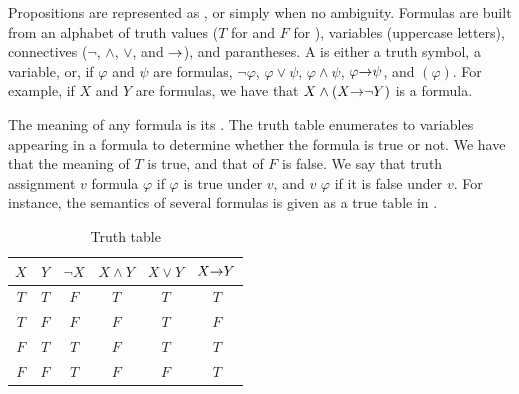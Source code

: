 Propositions are represented as , or simply  when no ambiguity.
Formulas are built from an alphabet of truth values ($T$ for  and $F$ for ),
variables (uppercase letters), connectives ($\neg$, $\land$, $\lor$, and $\mathit{\rightarrow}$), and parantheses.
A  is either a truth symbol, a variable, or, if $\varphi$ and $\psi$ are formulas,
$\neg \varphi$, $\varphi \lor \psi$, $\varphi \land \psi$, $ \varphi \mathit{\rightarrow} \psi$, and $(\varphi)$.
For example, if $X$ and $Y$ are formulas, we have that $X \land (X \mathit{\rightarrow} \neg Y)$ is a formula.

The meaning of any formula is its .
The truth table enumerates  to variables appearing in a formula to determine
whether the formula is true or not.
We have that the meaning of $T$ is true, and that of $F$ is false.
We say that truth assignment $v$  formula $\varphi$ if
$\varphi$ is true under $v$, and $v$  $\varphi$ if
it is false under $v$.
For instance, the semantics of several formulas is given as a true table in .

\begin{table}[ht]
\centering
	\begin{tabular}{ |c c|c c c c| }
	  \hline
	  $X$ & $Y$ & $\neg X$ & $X \land Y$ & $X \lor Y$ & $X \mathit{\rightarrow} Y$ \\
	  \hline
		$T$ & $T$ & $F$ & $T$ & $T$ & $T$ \\
	  \hline                            
		$T$ & $F$ & $F$ & $F$ & $T$ & $F$ \\
	  \hline                            
		$F$ & $T$ & $T$ & $F$ & $T$ & $T$ \\
	  \hline                            
		$F$ & $F$ & $T$ & $F$ & $F$ & $T$ \\
	  \hline
	\end{tabular}
	\caption{Truth table\label{tbl:truth}}
\end{table}

